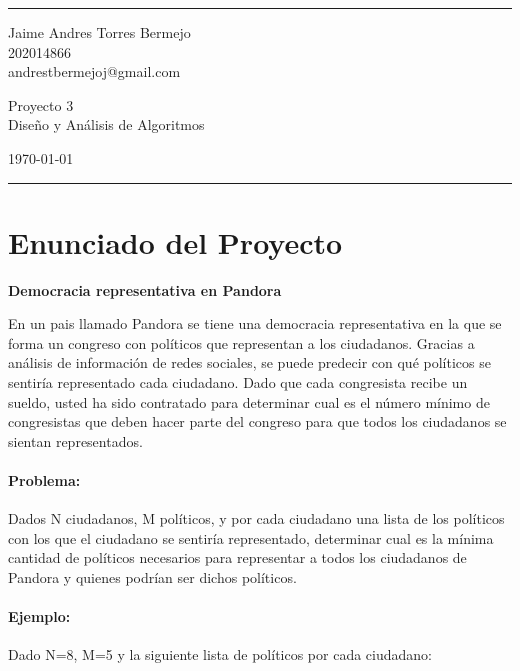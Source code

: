 \documentclass[a4paper]{article}
\begin{document}

\fancyhead[C]{}
\hrule \medskip %
\begin{minipage}{0.295\textwidth} 
\raggedright
\footnotesize
Jaime Andres Torres Bermejo \hfill\\   
202014866\hfill\\
andrestbermejoj@gmail.com
\end{minipage}
\begin{minipage}{0.4\textwidth} 
\centering 
\large 
Proyecto 3\\ 
\normalsize 
Diseño y Análisis de Algoritmos\\ 
\end{minipage}
\begin{minipage}{0.295\textwidth} 
\raggedleft
\today\hfill\\
\end{minipage}
\medskip\hrule 
\bigskip

\section{Enunciado del Proyecto}
\textbf{Democracia representativa en Pandora}

En un pais llamado Pandora se tiene una democracia representativa en la que se forma un
congreso con políticos que representan a los ciudadanos. Gracias a análisis de información de
redes sociales, se puede predecir con qué políticos se sentiría representado cada ciudadano. Dado
que cada congresista recibe un sueldo, usted ha sido contratado para determinar cual es el número
mínimo de congresistas que deben hacer parte del congreso para que todos los ciudadanos se
sientan representados.

\paragraph{Problema:}
Dados N ciudadanos, M políticos, y por cada ciudadano una lista de los políticos con los que el
ciudadano se sentiría representado, determinar cual es la mínima cantidad de políticos necesarios
para representar a todos los ciudadanos de Pandora y quienes podrían ser dichos políticos.

\paragraph{Ejemplo:}
Dado N=8, M=5 y la siguiente lista de políticos por cada ciudadano:
\end{document}

